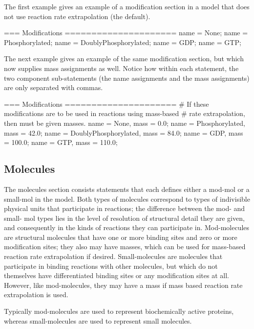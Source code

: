 The first example gives an example of a modification section in a
model that does not use reaction rate extrapolation (the default).

\begin{ExampleMZR}
=== Modifications =====================
     name = None;
     name = Phosphorylated;
     name = DoublyPhosphorylated;
     name = GDP;
     name = GTP;
\end{ExampleMZR}

The next example gives an example of the same modification section,
but which now supplies mass assignments as well.  Notice how within
each statement, the two component sub-statements (the name assignments
and the mass assignments) are only separated with commas.

\begin{ExampleMZR}
=== Modifications =====================
     # If these modifications are to be used in reactions using mass-based
     # rate extrapolation, then must be given masses.
     name = None, mass = 0.0;
     name = Phosphorylated, mass = 42.0;
     name = DoublyPhosphorylated, mass = 84.0;
     name = GDP, mass = 100.0;
     name = GTP, mass = 110.0;
\end{ExampleMZR}


\subsection{Molecules}
The molecules section consists statements that each defines either a
mod-mol or a small-mol in the model.  Both types of molecules correspond to
types of indivisible physical units that participate in reactions; the
difference between the mod- and small- mol types lies in the level of
resolution of structural detail they are given, and consequently in the
kinds of reactions they can participate in. Mod-molecules are structural
molecules that have one or more binding sites and zero or more
modification sites; they also may have masses, which can be used for
mass-based reaction rate extrapolation if desired.  Small-molecules are
molecules that participate in binding reactions with other molecules, but which
do not themselves have differentiated binding sites or any
modification sites at all. However, like mod-molecules, they may have
a mass if mass based reaction rate extrapolation is used.

Typically mod-molecules are used to represent biochemically active
proteins, whereas small-molecules are used to represent small molecules.  

